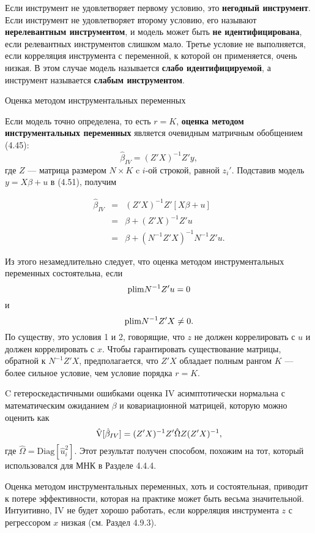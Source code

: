 Если инструмент не удовлетворяет первому условию, это \textbf{негодный инструмент}. Если инструмент не удовлетворяет второму условию, его называют \textbf{нерелевантным инструментом}, и модель может быть \textbf{не идентифицирована}, если релевантных инструментов слишком мало.  Третье условие не выполняется, если корреляция инструмента с переменной, к которой он применяется, очень низкая. В этом случае модель называется \textbf{слабо идентифицируемой}, а инструмент называется \textbf{слабым инструментом}.
\begin{center}
Оценка методом инструментальных переменных
\end{center}
Если модель точно определена, то есть $r=K$, \textbf{оценка методом инструментальных переменных} является очевидным матричным обобщением (4.45):
\begin{equation}
\hat{\beta}_{IV} = (Z'X)^{-1}Z'y, 
\end{equation}
где $Z$ --- матрица размером $N\times K$ c $i$-ой строкой, равной $z_i'$. Подставив модель $y = X\beta+u$ в (4.51), получим

\[
\begin{array}{rcl}
\hat{\beta}_{IV} & = & (Z'X)^{-1} Z'[X\beta +u] \\
& = & \beta + (Z'X)^{-1} Z'u \\
& = & \beta + (N^{-1}Z'X)^{-1} N^{-1}Z'u.
\end{array}
\]

Из этого незамедлительно следует, что оценка методом инструментальных переменных состоятельна, если 
$$
\mathrm{plim } N^{-1}Z'u = 0
$$
и
$$
\mathrm{plim } N^{-1}Z'X \neq 0.
$$
По существу, это условия 1 и 2, говорящие, что $z$ не должен коррелировать с $u$ и должен коррелировать с $x$. Чтобы гарантировать существование матрицы, обратной к 	$N^{-1}Z'X$, предполагается, что $Z'X$ обладает полным рангом $K$ --- более сильное условие, чем условие порядка $r=K$.

C гетероскедастичными ошибками оценка IV асимптотически нормальна с математическим ожиданием $\beta$ и ковариационной матрицей, которую можно оценить как
\begin{equation}
\hat{\mathrm{V}}[\hat{\beta}_{IV}] = (Z'X)^{-1} Z'\hat{\Omega}Z(Z'X)^{-1},
\end{equation}
где $\hat{\Omega} = \mathrm{Diag}[\hat{u}_i^2]$. Этот результат получен способом, похожим на тот, который использовался для МНК в Разделе 4.4.4.

Оценка методом инструментальных переменных, хоть и состоятельная, приводит к потере эффективности, которая на практике может быть весьма значительной. Интуитивно, IV не будет хорошо работать, если корреляция инструмента $z$ с регрессором $x$ низкая (см. Раздел 4.9.3).


